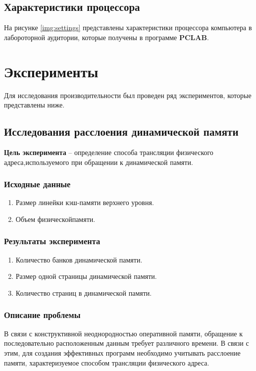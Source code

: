\section{Характеристики процессора}

На рисунке \ref{img:settings} представлены характеристики процессора компьютера в лабороторной аудитории, которые получены в программе \textbf{PCLAB}.




\chapter{Эксперименты}

Для исследования производительности был проведен ряд экспериментов, которые представлены ниже.


\section{Исследования расслоения динамической памяти}

\textbf{Цель эксперимента} -- определение   способа   трансляции   физического   адреса,используемого при обращении к динамической памяти.

\subsection{Исходные данные}
\begin{enumerate}
	\item Размер линейки кэш-памяти верхнего уровня.
	\item Объем физическойпамяти.
\end{enumerate}

\subsection{Результаты эксперимента}
\begin{enumerate}
	\item Количество банков динамической памяти.
	\item Размер одной страницы динамической памяти.
	\item Количество страниц в динамической памяти.
\end{enumerate}


\subsection{Описание проблемы}
В связи с конструктивной неоднородностью   оперативной памяти,   обращение к последовательно расположенным данным   требует различного времени. В связи с этим, для создания эффективных программ необходимо учитывать расслоение памяти, характеризуемое способом трансляции физического адреса. 

